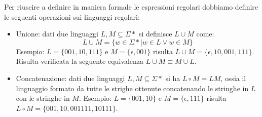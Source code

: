 \documentclass[a4paper]{book}
\theoremstyle{definition}%
\begin{document}
Per riuscire a definire in maniera formale le espressioni regolari dobbiamo definire le seguenti operazioni sui linguaggi regolari:
\begin{itemize}
  \item Unione: dati due linguaggi $L,M \subseteq \Sigma*$ si definisce $L \cup M$ come:
    \[ L \cup M = \{w \in \Sigma* | w \in L \lor w \in M\} \]
    Esempio: $L = \{001, 10, 111\}$ e $M = \{\epsilon, 001\}$ risulta $L \cup M = \{\epsilon, 10, 001, 111\}$.\newline
    Risulta verificata la seguente equivalenza $L\cup M \equiv M\cup L$.

  \item Concatenazione: dati due linguaggi $L, M \subseteq \Sigma*$ si ha $L \circ M = LM$, ossia il linguaggio formato da tutte le strighe
    ottenute concatenando le stringhe in $L$ con le stringhe in $M$.
    Esempio: $L = \{001,10\}$ e $M = \{\epsilon, 111\}$ risulta $L \circ M = \{001, 10, 001111, 10111\}$.


\end{itemize}
\end{document}
